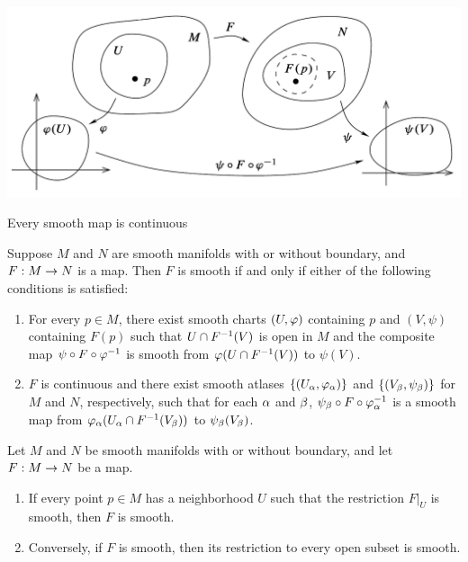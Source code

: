 \begin{center}
    \includegraphics[scale = 0.4]{chapter02/c2f2.png}
\end{center}

\setcounter{thm}{3}

\begin{prop}
Every smooth map is continuous
\end{prop}

\begin{prop}
Suppose $M$ and $N$ are smooth manifolds with or without boundary, and $F:M\rightarrow N$ is a map. Then $F$ is smooth if and only if either of the following conditions is satisfied:
\begin{enumerate}
    \item For every $p\in M$, there exist smooth charts $(U,\varphi)$ containing $p$ and $(V, \psi)$ containing $F(p)$ such that $U\cap F^{-1}(V)$ is open in $M$ and the composite map $\psi\circ F\circ \varphi^{-1}$ is smooth from $\varphi(U\cap F^{-1}(V))$ to $\psi(V)$.
    \item $F$ is continuous and there exist smooth atlases $\{(U_\alpha, \varphi_\alpha)\}$ and $\{(V_\beta, \psi_\beta)\}$ for $M$ and $N$, respectively, such that for each $\alpha$ and $\beta$, $\psi_\beta\circ F\circ\varphi_\alpha^{-1}$ is a smooth map from $\varphi_\alpha(U_\alpha\cap F^{-1}(V_\beta))$ to $\psi_\beta(V_\beta)$.
\end{enumerate}
\end{prop}

\begin{prop}Let $M$ and $N$ be smooth manifolds with or without boundary, and let $F:M\rightarrow N$ be a map.
\begin{enumerate}
    \item If every point $p\in M$ has a neighborhood $U$ such that the restriction $F|_U$ is smooth, then $F$ is smooth.
    \item Conversely, if $F$ is smooth, then its restriction to every open subset is smooth.
\end{enumerate}
\end{prop}

